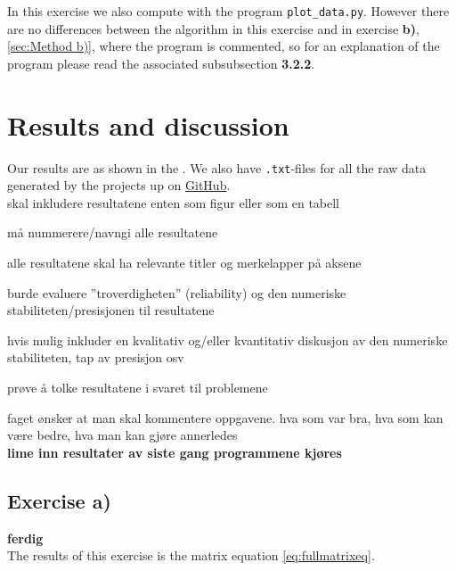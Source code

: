 \documentclass{article}
\begin{document}
    In this exercise we also compute with the program \texttt{plot\_data.py}. However there are no differences between the algorithm in this exercise and in exercise \textbf{b)}, \ref{sec:Method b)}, where the program is commented, so for an explanation of the program please read the associated subsubsection \textbf{3.2.2}.



\vspace{1cm}

\section{Results and discussion} \label{sec:Results}

  Our results are as shown in the . We also have \texttt{.txt}-files for all the raw data generated by the projects up on \href{https://github.com/Erikbgram/Fys3150}{GitHub}. \\

  skal inkludere resultatene enten som figur eller som en tabell

  må nummerere/navngi alle resultatene

  alle resultatene skal ha relevante titler og merkelapper på aksene

  burde evaluere ''troverdigheten'' (reliability) og den numeriske stabiliteten/presisjonen til resultatene

  hvis mulig inkluder en kvalitativ og/eller kvantitativ diskusjon av den numeriske stabiliteten, tap av presisjon osv

  prøve å tolke resultatene i svaret til problemene

  faget ønsker at man skal kommentere oppgavene. hva som var bra, hva som kan være bedre, hva man kan gjøre annerledes \\

  {\bf lime inn resultater av siste gang programmene kjøres} \\

  \subsection{Exercise a)} \label{sec:Results a)}

    {\bf ferdig} \\

    The results of this exercise is the matrix equation \ref{eq:fullmatrixeq}.
\end{document}
